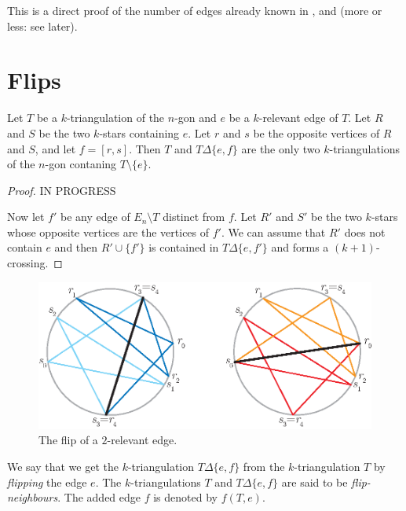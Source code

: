 \documentclass[12pt]{amsart}
\begin{document}
\begin{bibremark}
This is a direct proof of the number of edges already known in \cite{n-gdfcp-00}, \cite{j-gt} and \cite{dkm-lahp-02} (more or less: see later).

\end{bibremark}


\section{Flips}

\begin{proposition}\label{flip}
Let $T$ be a $k$-triangulation of the $n$-gon and $e$ be a $k$-relevant edge of $T$. Let $R$ and $S$ be the two $k$-stars containing $e$. Let $r$ and $s$ be the opposite vertices of $R$ and $S$, and let $f=[r,s]$. Then $T$ and $T\Delta\{e,f\}$ are the only two $k$-triangulations of the $n$-gon contaning $T\setminus\{e\}$.
\end{proposition}

\begin{proof}
IN PROGRESS

\bigskip
Now let $f'$ be any edge of $E_n\setminus T$ distinct from $f$. Let $R'$ and $S'$ be the two $k$-stars whose opposite vertices are the vertices of $f'$. We can assume that $R'$ does not contain $e$ and then $R'\cup\{f'\}$ is contained in $T\Delta\{e,f'\}$ and forms a $(k+1)$-crossing.
\end{proof}

\begin{figure}
\centerline{\includegraphics[scale=1]{flip.eps}}
\caption{\small{The flip of a $2$-relevant edge.}}\label{flip}
\end{figure}

We say that we get the $k$-triangulation $T\Delta\{e,f\}$ from the $k$-triangulation $T$ by \emph{flipping} the edge $e$. The $k$-triangulations $T$ and $T\Delta\{e,f\}$ are said to be \emph{flip-neighbours}. The added edge $f$ is denoted by $f(T,e)$.
\end{document}
